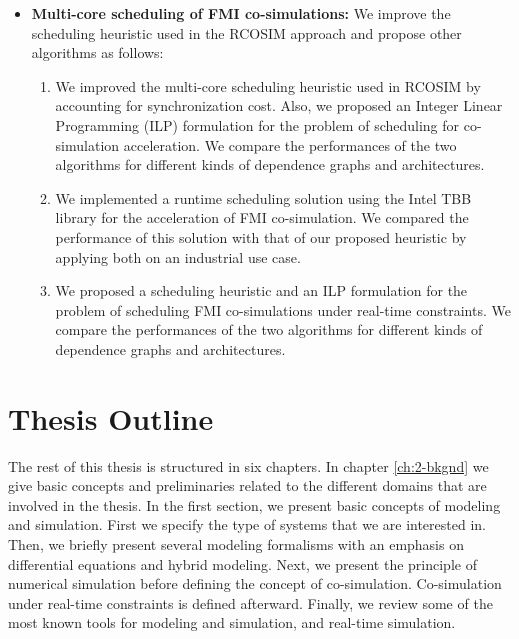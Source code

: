 \begin{itemize}
\begin{enumerate}
\setcounter{enumTemp}{\theenumi}

\end{enumerate}

\item \textbf{Multi-core scheduling of FMI co-simulations:} We improve the scheduling heuristic used in the RCOSIM approach and propose other algorithms as follows:

\begin{enumerate}

\setcounter{enumi}{\theenumTemp}

\item We improved the multi-core scheduling heuristic used in RCOSIM by accounting for synchronization cost. Also, we proposed an Integer Linear Programming (ILP) formulation for the problem of scheduling for co-simulation acceleration. We compare the performances of the two algorithms for different kinds of dependence graphs and architectures.

\item We implemented a runtime scheduling solution using the Intel TBB library \cite{reinders:2007} for the acceleration of FMI co-simulation. We compared the performance of this solution with that of our proposed heuristic by applying both on an industrial use case.

\item We proposed a scheduling heuristic and an ILP formulation for the problem of scheduling FMI co-simulations under real-time constraints. We compare the performances of the two algorithms for different kinds of dependence graphs and architectures.   

\end{enumerate}

\end{itemize}

\section{Thesis Outline}

The rest of this thesis is structured in six chapters. In chapter \ref{ch:2-bkgnd} we give basic concepts and preliminaries related to the different domains that are involved in the thesis. In the first section, we present basic concepts of modeling and simulation. First we specify the type of systems that we are interested in. Then, we briefly present several modeling formalisms with an emphasis on differential equations and hybrid modeling. Next, we present the principle of numerical simulation before defining the concept of co-simulation. Co-simulation under real-time constraints is defined afterward. Finally, we review some of the most known tools for modeling and simulation, and real-time simulation.

